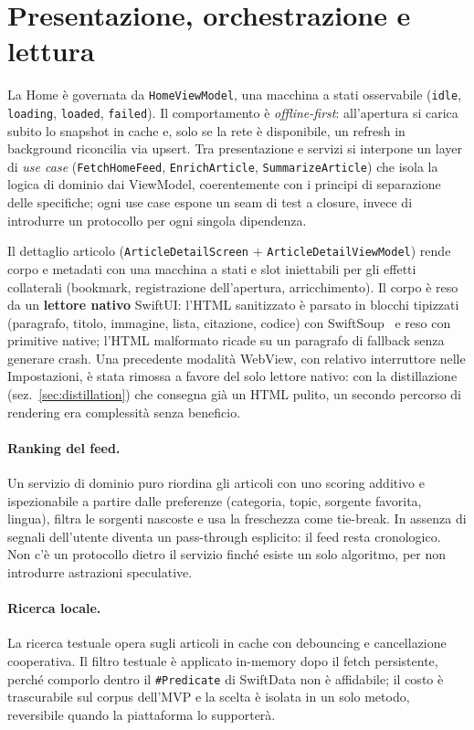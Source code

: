 \section{Presentazione, orchestrazione e lettura}
La Home è governata da \texttt{HomeViewModel}, una macchina a stati
osservabile (\texttt{idle}, \texttt{loading}, \texttt{loaded},
\texttt{failed}). Il comportamento è \emph{offline-first}: all'apertura
si carica subito lo snapshot in cache e, solo se la rete è disponibile,
un refresh in background riconcilia via upsert. Tra presentazione e
servizi si interpone un layer di \emph{use case}
(\texttt{FetchHomeFeed}, \texttt{EnrichArticle},
\texttt{SummarizeArticle}) che isola la logica di dominio dai ViewModel,
coerentemente con i principi di separazione delle specifiche; ogni use
case espone un seam di test a closure, invece di introdurre un
protocollo per ogni singola dipendenza.

Il dettaglio articolo (\texttt{ArticleDetailScreen} +
\texttt{ArticleDetailViewModel}) rende corpo e metadati con una macchina
a stati e slot iniettabili per gli effetti collaterali (bookmark,
registrazione dell'apertura, arricchimento). Il corpo è reso da un
\textbf{lettore nativo} SwiftUI: l'HTML sanitizzato è parsato in blocchi
tipizzati (paragrafo, titolo, immagine, lista, citazione, codice) con
SwiftSoup~\cite{jsoup} e reso con primitive native; l'HTML malformato
ricade su un paragrafo di fallback senza generare crash. Una precedente
modalità WebView, con relativo interruttore nelle Impostazioni, è stata
rimossa a favore del solo lettore nativo: con la distillazione
(sez.~\ref{sec:distillation}) che consegna già un HTML pulito, un secondo
percorso di rendering era complessità senza beneficio.

\paragraph{Ranking del feed.}
\label{sec:feed-ranking}
Un servizio di dominio puro riordina gli articoli con uno scoring
additivo e ispezionabile a partire dalle preferenze (categoria, topic,
sorgente favorita, lingua), filtra le sorgenti nascoste e usa la
freschezza come tie-break. In assenza di segnali dell'utente diventa un
pass-through esplicito: il feed resta cronologico. Non c'è un protocollo
dietro il servizio finché esiste un solo algoritmo, per non introdurre
astrazioni speculative.

\paragraph{Ricerca locale.} La ricerca testuale opera sugli articoli in
cache con debouncing e cancellazione cooperativa. Il filtro testuale è
applicato in-memory dopo il fetch persistente, perché comporlo dentro il
\texttt{\#Predicate} di SwiftData non è affidabile; il costo è
trascurabile sul corpus dell'MVP e la scelta è isolata in un solo
metodo, reversibile quando la piattaforma lo supporterà.

